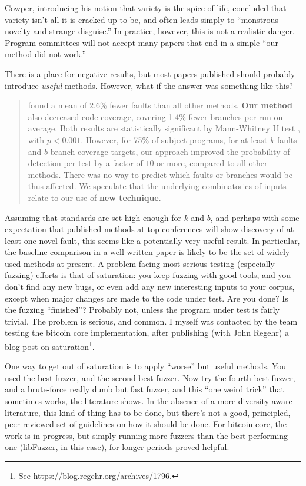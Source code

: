 \documentclass[sigplan,review]{acmart}
\begin{document}
Cowper, introducing his notion that variety is the spice of life,
concluded that variety isn't all it is cracked up to be, and often
leads simply to ``monstrous novelty and strange disguise.''  In
practice, however, this is not a realistic danger.  Program committees
will not accept many papers that end in a simple ``our method did not work.''

There is a place for negative results, but most papers published
should probably introduce \emph{useful} methods.  However, what if the
answer was something like this?

\begin{quote}
 found a mean of 2.6\% fewer faults than all
other methods.  {\bf Our
  method} also decreased code coverage, covering 1.4\% fewer branches
per run on average.  Both results are statistically significant by
Mann-Whitney U test \cite{arcuri2014hitchhiker}, with $p < 0.001$.
However, for 75\% of subject programs, for at least $k$ faults and $b$
branch coverage targets, our approach improved the probability of
detection per test by a factor of $10$ or more, compared to all other
methods.  There was no way to predict which faults or branches would
be thus affected.  We speculate that the underlying combinatorics of
inputs relate to our use of {\bf new technique}.
\end{quote}

Assuming that standards are set high enough for $k$ and $b$, and
perhaps with some expectation that published methods at top
conferences will show discovery of at least one novel fault, this
seems like a potentially very useful result.  In particular, the
baseline comparison in a well-written paper is likely to be the set of
widely-used methods at present.  A problem facing most serious testing
(especially fuzzing) efforts is that of saturation:  you keep fuzzing
with good tools, and you don't find any new bugs, or even add any new
interesting inputs to your corpus, except when major changes are made
to the code under test.  Are you done?  Is the fuzzing ``finished''?
Probably not, unless the program under test is fairly trivial.  The
problem is serious, and common.  I myself was contacted by the team
testing the bitcoin core implementation, after publishing (with John
Regehr) a blog post
on saturation\footnote{See
  \url{https://blog.regehr.org/archives/1796}.}.

One way to get out of saturation is to apply ``worse'' but useful
methods.  You used the best fuzzer, and the second-best fuzzer.  Now
try the fourth best fuzzer, and a brute-force really dumb but fast
fuzzer, and this ``one weird trick'' that sometimes works, the
literature shows.  In the absence of a more diversity-aware
literature, this kind of thing has to be done, but there's not a good,
principled, peer-reviewed set of guidelines on how it should be done.
For bitcoin core, the work is in progress, but simply running more
fuzzers than the best-performing one (libFuzzer, in this case), for
longer periods proved helpful.
\end{document}
